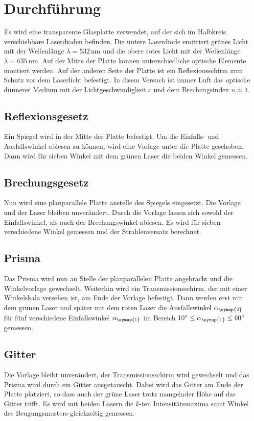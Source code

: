 \section{Durchführung}
\label{sec:Durchführung}
Es wird eine transparente Glasplatte verwendet, auf der sich im Halbkreis verschiebbare Laserdioden befinden.
Die untere Laserdiode emittiert grünes Licht mit der Wellenlänge $\lambda=532\,\unit{\nano\meter}$ und die
obere rotes Licht mit der Wellenlänge $\lambda=635\,\unit{\nano\meter}$. Auf der Mitte der Platte können
unterschiedliche optische Elemente montiert werden. Auf der anderen Seite der Platte ist ein Reflexionsschirm
zum Schutz vor dem Laserlicht befestigt. In disem Versuch ist immer Luft das optische dünnerer Medium mit der
Lichtgeschwindigkeit $c$ und dem Brechungsindex $n\approx1$.

\subsection{Reflexionsgesetz}
\label{sec:Reflexionsgesetz}
Ein Spiegel wird in der Mitte der Platte befestigt. Um die Einfalls- und Ausfallswinkel ablesen zu können,
wird eine Vorlage unter die Platte geschoben. Dann wird für sieben Winkel mit dem grünen Laser die
beiden Winkel gemessen.

\subsection{Brechungsgesetz}
\label{sec:Brechungsgesetz}
Nun wird eine planparallele Platte anstelle des Spiegels eingesetzt. Die Vorlage und der Laser bleiben
unverändert. Durch die Vorlage lassen sich sowohl der Einfallswinkel, als auch der Brechungswinkel
ablesen. Es wird für sieben verschiedene Winkel gemessen und der Strahlenversatz berechnet.

\subsection{Prisma}
\label{sec:Prisma}
Das Prisma wird nun an Stelle der planparallelen Platte angebracht und die Winkelvorlage gewechselt.
Weiterhin wird ein Transmissionsschirm, der mit einer Winkelskala versehen ist, am Ende der Vorlage befestigt.
Dann werden erst mit dem grünen Laser und später mit dem roten Laser die Ausfallswinkel $\alpha_{\symup{2}}$ für
fünf verschiedene Einfallswinkel $\alpha_{\symup{1}}$ im Bereich $10^{\circ} \leq \alpha_{\symup{1}} \leq 60^{\circ}$
gemessen.

\subsection{Gitter}
\label{sec:Gitter}
Die Vorlage bleibt unverändert, der Transmissionsschirm wird gewechselt und das Prisma wird durch ein Gitter ausgetauscht.
Dabei wird das Gitter am Ende der Platte platziert, so dass auch der grüne Laser trotz mangelnder Höhe auf das Gitter trifft.
Es wird mit beiden Lasern die $k$-ten Intensitätsmaxima samt Winkel des Beugungsmusters gleichzeitig gemessen.